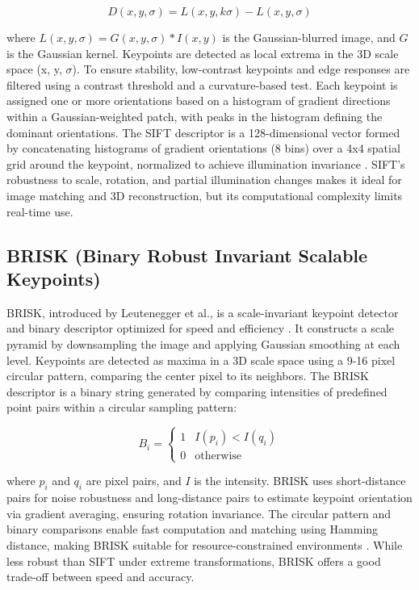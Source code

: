 \documentclass[journal]{IEEEtran}
\begin{document}
\begin{equation}
D(x, y, \sigma) = L(x, y, k\sigma) - L(x, y, \sigma)
\end{equation}

where \( L(x, y, \sigma) = G(x, y, \sigma) * I(x, y) \) is the Gaussian-blurred image, and \( G \) is the Gaussian kernel. Keypoints are detected as local extrema in the 3D scale space (x, y, \( \sigma \)). To ensure stability, low-contrast keypoints and edge responses are filtered using a contrast threshold and a curvature-based test. Each keypoint is assigned one or more orientations based on a histogram of gradient directions within a Gaussian-weighted patch, with peaks in the histogram defining the dominant orientations. The SIFT descriptor is a 128-dimensional vector formed by concatenating histograms of gradient orientations (8 bins) over a 4x4 spatial grid around the keypoint, normalized to achieve illumination invariance \cite{SIFT}. SIFT’s robustness to scale, rotation, and partial illumination changes makes it ideal for image matching and 3D reconstruction, but its computational complexity limits real-time use.\\

\subsection{BRISK (Binary Robust Invariant Scalable Keypoints)}
BRISK, introduced by Leutenegger et al., is a scale-invariant keypoint detector and binary descriptor optimized for speed and efficiency \cite{BRISK}. It constructs a scale pyramid by downsampling the image and applying Gaussian smoothing at each level. Keypoints are detected as maxima in a 3D scale space using a 9-16 pixel circular pattern, comparing the center pixel to its neighbors. The BRISK descriptor is a binary string generated by comparing intensities of predefined point pairs within a circular sampling pattern:

\begin{equation}
B_i = \begin{cases} 1 & I(p_i) < I(q_i) \\ 0 & \text{otherwise} \end{cases}
\end{equation}

where \( p_i \) and \( q_i \) are pixel pairs, and \( I \) is the intensity. BRISK uses short-distance pairs for noise robustness and long-distance pairs to estimate keypoint orientation via gradient averaging, ensuring rotation invariance. The circular pattern and binary comparisons enable fast computation and matching using Hamming distance, making BRISK suitable for resource-constrained environments \cite{BRISK}. While less robust than SIFT under extreme transformations, BRISK offers a good trade-off between speed and accuracy.\\
\end{document}
